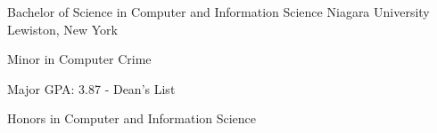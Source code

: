 

\begin{cventries}

  \cventry
    {Bachelor of Science in Computer and Information Science} %
    {Niagara University} %
    {Lewiston, New York} %
    {} %
    {
      \begin{cvitems} %
        \item {Minor in Computer Crime}
        \item {Major GPA: 3.87 - Dean's List}
        \item {Honors in Computer and Information Science}
      \end{cvitems}
    }

\end{cventries}